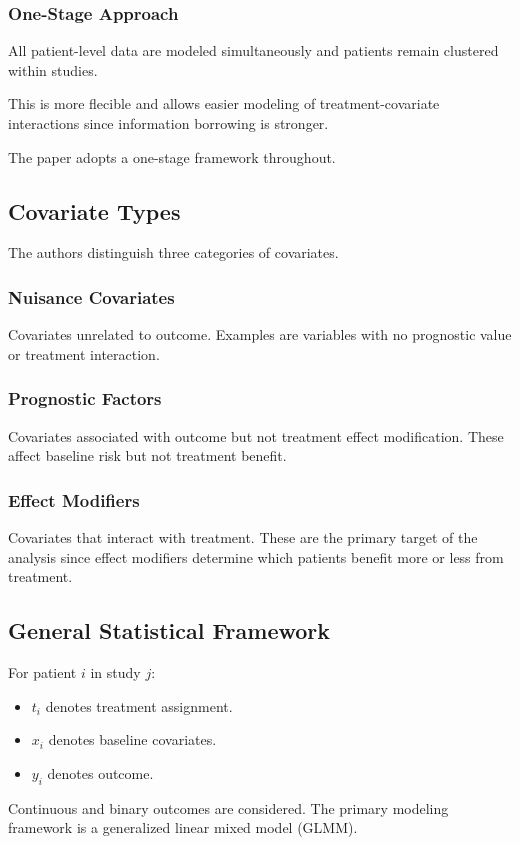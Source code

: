 \documentclass[11pt]{article}
\begin{document}
\subsubsection*{One-Stage Approach}

All patient-level data are modeled simultaneously and patients remain clustered within studies.

This is more flecible and allows easier modeling of treatment-covariate interactions since information borrowing is stronger.

The paper adopts a one-stage framework throughout.

\subsection*{Covariate Types}

The authors distinguish three categories of covariates.

\subsubsection*{Nuisance Covariates}

Covariates unrelated to outcome. Examples are variables with no prognostic value or treatment interaction.

\subsubsection*{Prognostic Factors}

Covariates associated with outcome but not treatment effect modification. These affect baseline risk but not treatment benefit.

\subsubsection*{Effect Modifiers}

Covariates that interact with treatment. These are the primary target of the analysis since effect modifiers determine which patients benefit more or less from treatment.

\subsection*{General Statistical Framework}

For patient $i$ in study $j$:
\begin{itemize}
    \item $t_i$ denotes treatment assignment.
    \item $x_i$ denotes baseline covariates.
    \item $y_i$ denotes outcome.
\end{itemize}
Continuous and binary outcomes are considered. The primary modeling framework is a generalized linear mixed model (GLMM).
\end{document}

